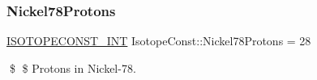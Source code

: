 \subsubsection{\texorpdfstring{Nickel78\+Protons}{Nickel78Protons}}
{\footnotesize\ttfamily \mbox{\hyperlink{group___isotope_const-_macros_ga5f18360b3e99483a35c32d789e62621c}{I\+S\+O\+T\+O\+P\+E\+C\+O\+N\+S\+T\+\_\+\+I\+NT}} Isotope\+Const\+::\+Nickel78\+Protons = 28}

\$ \$ Protons in Nickel-\/78. 